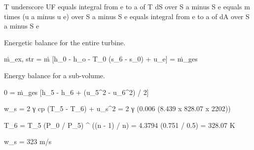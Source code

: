T underscore UF equals integral from e to a of T dS over S a minus S e equals m times (u a minus u e) over S a minus S e equals integral from e to a of dA over S a minus S e

Energetic balance for the entire turbine.

ṁ_ex, str = ṁ [h_0 - h_o - T_0 (s_6 - s_0) + u_e] = ṁ_ges

Energy balance for a sub-volume.

0 = ṁ_ges [h_5 - h_6 + (u_5^2 - u_6^2) / 2]

w_s = 2 γ cp (T_5 - T_6) + u_s^2 = 2 γ (0.006 (8.439 x 828.07 x 2202))

T_6 = T_5 (P_0 / P_5) ^ ((n - 1) / n) = 4.3794 (0.751 / 0.5) = 328.07 K

w_s = 323 m/s